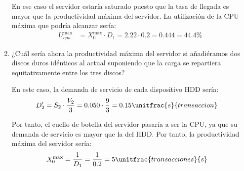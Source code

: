 \begin{ejercicio}
\begin{enumerate}
        En ese caso el servidor estaría saturado puesto que la tasa de llegada es mayor que la productividad máxima del servidor. La utilización de la CPU máxima que podría alcanzar sería:
        \begin{align*}
            U_{cpu}^{\max} &= X_0^{\max} \cdot D_1 = 2.22 \cdot 0.2 = 0.444 = 44.4\%
        \end{align*}
        \item ¿Cuál sería ahora la productividad máxima del servidor si añadiéramos dos discos duros idénticos al actual suponiendo que la carga se repartiera equitativamente entre los tres discos?
        
        En este caso, la demanda de servicio de cada dispositivo HDD sería:
        \begin{align*}
            D_2' &= S_2\cdot \frac{V_2}{3} = 0.050 \cdot \frac{9}{3} = 0.15 \unitfrac{s}{transaccion}
        \end{align*}

        Por tanto, el cuello de botella del servidor pasaría a ser la CPU, ya que su demanda de servicio es mayor que la del HDD. Por tanto, la productividad máxima del servidor sería:
        \begin{align*}
            X_0^{\max} &= \dfrac{1}{D_1} = \dfrac{1}{0.2} = 5 \unitfrac{transacciones}{s}
        \end{align*}
    \end{enumerate}
\end{ejercicio}
\begin{comment}
\solucion
    \begin{enumerate}
        \item El cuello de botella es el HDD ya que su demanda de servicio ($0.45$ s) es mayor que la de la CPU ($0.2$ s). La productividad máxima del servidor es $X_0^{\max} = 2.22$ transacciones/s.
        \item La utilización de la CPU es $U_{cpu} = 0.3$ (30\%).
        \item En ese caso el servidor estaría saturado. La utilización de la CPU jamás podría ser mayor que el 44\% en este servidor.
        \item Ahora, la productividad máxima del servidor sería $
        \item X_0^{\max} = 5$ transacciones/s (el cuello de botella pasaría a ser la CPU).
    \end{enumerate}
\end{comment}

